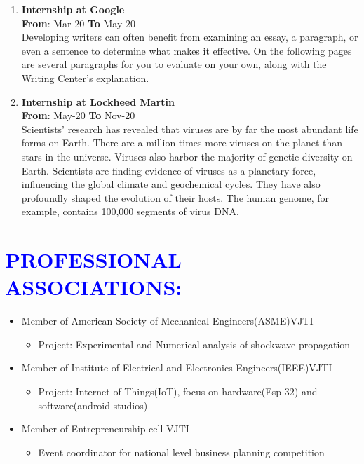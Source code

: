 \documentclass{article}
\begin{document}
\begin{multicols}{2}

\begin{enumerate}
	\item {\textbf{Internship at Google}}\\
	\hfill {\textbf{From}}: Mar-20 {\textbf{To}} May-20\\
	Developing writers can often benefit from examining an essay, a paragraph, or even a sentence to determine what makes it effective. On the following pages are several paragraphs for you to evaluate on your own, along with the Writing Center's explanation.
	\item {\textbf{Internship at Lockheed Martin}}\\
	\hfill {\textbf{From}}: May-20 {\textbf{To}} Nov-20\\
	 Scientists' research has revealed that viruses are by far the most abundant life forms on Earth. There are a million times more viruses on the planet than stars in the universe. Viruses also harbor the majority of genetic diversity on Earth. Scientists are finding evidence of viruses as a planetary force, influencing the global climate and geochemical cycles. They have also profoundly shaped the evolution of their hosts. The human genome, for example, contains 100,000 segments of virus DNA.
\end{enumerate}

\vspace{5pt}
\section*{\large{\textcolor{blue}{\uppercase{Professional Associations:}}}}


\renewcommand{\labelitemii}{$\circ$}
\begin{itemize}[noitemsep,nolistsep]
	\item Member of American Society of Mechanical Engineers(ASME)VJTI
	\begin{itemize}[noitemsep,nolistsep]
		\item Project: Experimental and Numerical analysis of shockwave propagation
	\end{itemize}
	\item Member of Institute of Electrical and Electronics Engineers(IEEE)VJTI
	\begin{itemize}[noitemsep,nolistsep]
		\item Project: Internet of Things(IoT), focus on hardware(Esp-32) and software(android studios)
	\end{itemize}
	\item Member of Entrepreneurship-cell VJTI
	\begin{itemize}[noitemsep,nolistsep]
		\item Event coordinator for national level business planning competition
	\end{itemize}
\end{itemize}


\end{multicols}
\end{document}
